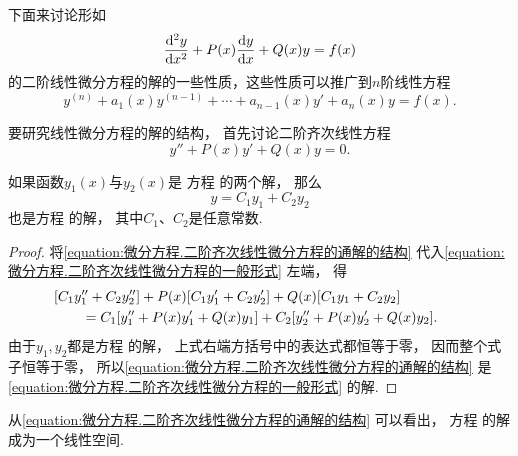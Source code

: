 下面来讨论形如
\begin{equation}\label{equation:微分方程.二阶非齐次线性微分方程的一般形式}
	\dv[2]{y}{x} + P(x) \dv{y}{x} + Q(x) y = f(x)
\end{equation}
的二阶线性微分方程的解的一些性质，这些性质可以推广到\(n\)阶线性方程
\begin{equation}\label{equation:微分方程.n阶线性微分方程的一般形式}
	y^{(n)} + a_1(x) y^{(n-1)} + \dotsb + a_{n-1}(x) y' + a_n(x) y = f(x).
\end{equation}

要研究线性微分方程的解的结构，
首先讨论二阶齐次线性方程\begin{equation}\label{equation:微分方程.二阶齐次线性微分方程的一般形式}
	y'' + P(x) y' + Q(x) y = 0.
\end{equation}

\begin{theorem}
如果函数\(y_1(x)\)与\(y_2(x)\)是
方程  的两个解，
那么\begin{equation}\label{equation:微分方程.二阶齐次线性微分方程的通解的结构}
	y = C_1 y_1 + C_2 y_2
\end{equation}
也是方程  的解，
其中\(C_1\)、\(C_2\)是任意常数.
\begin{proof}
将\cref{equation:微分方程.二阶齐次线性微分方程的通解的结构}
代入\cref{equation:微分方程.二阶齐次线性微分方程的一般形式} 左端，
得\begin{align*}
	&\hspace{-20pt}
	[C_1 y_1'' + C_2 y_2'']
	+ P(x) [C_1 y_1' + C_2 y_2']
	+ Q(x) [C_1 y_1 + C_2 y_2] \\
	&= C_1 [y_1'' + P(x) y_1' + Q(x) y_1]
	+ C_2 [y_2'' + P(x) y_2' + Q(x) y_2].
\end{align*}
由于\(y_1,y_2\)都是方程  的解，
上式右端方括号中的表达式都恒等于零，
因而整个式子恒等于零，
所以\cref{equation:微分方程.二阶齐次线性微分方程的通解的结构}
是\cref{equation:微分方程.二阶齐次线性微分方程的一般形式} 的解.
\end{proof}
\end{theorem}
从\cref{equation:微分方程.二阶齐次线性微分方程的通解的结构} 可以看出，
方程  的解
成为一个线性空间.

